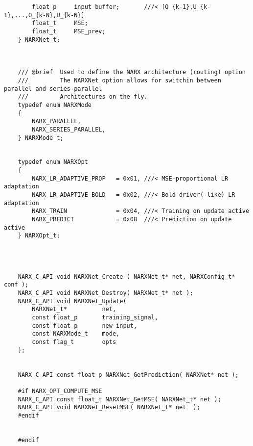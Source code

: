 \begin{lstlisting}
		float_p		input_buffer;		///< [O_{k-1},U_{k-1},...,O_{k-N},U_{k-N}]
		float_t		MSE;
		float_t		MSE_prev;
	} NARXNet_t;



	/// @brief	Used to define the NARX architecture (routing) option
	///			The NARXNet option allows for switchin between parallel and series-parallel
	///			Architectures on the fly.
	typedef enum NARXMode
	{
		NARX_PARALLEL,
		NARX_SERIES_PARALLEL,
	} NARXMode_t;


	typedef enum NARXOpt
	{
		NARX_LR_ADAPTIVE_PROP	= 0x01,	///< MSE-proportional LR adaptation
		NARX_LR_ADAPTIVE_BOLD	= 0x02,	///< Bold-driver(-like) LR adaptation
		NARX_TRAIN				= 0x04,	///< Training on update active
		NARX_PREDICT			= 0x08	///< Prediction on update active
	} NARXOpt_t;




	NARX_C_API void NARXNet_Create ( NARXNet_t* net, NARXConfig_t*	conf );
	NARX_C_API void NARXNet_Destroy( NARXNet_t* net );
	NARX_C_API void NARXNet_Update(
		NARXNet_t*			net,
		const float_p		training_signal,
		const float_p		new_input,
		const NARXMode_t	mode,
		const flag_t		opts
	);


	NARX_C_API const float_p NARXNet_GetPrediction( NARXNet* net );

	#if NARX_OPT_COMPUTE_MSE
	NARX_C_API const float_t NARXNet_GetMSE( NARXNet_t* net );
	NARX_C_API void NARXNet_ResetMSE( NARXNet_t* net  );
	#endif


	#endif





\end{lstlisting}


